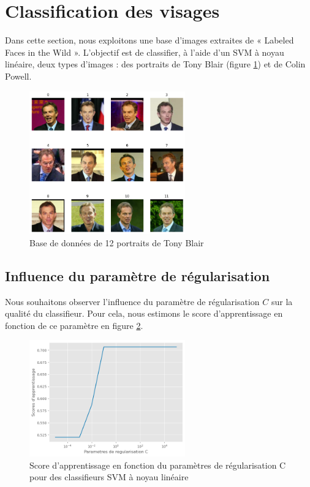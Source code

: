\documentclass[a4paper,12pt]{article}
\begin{document}
\newpage

\section{Classification des visages}

Dans cette section, nous exploitons une base d'images extraites de « Labeled Faces in the Wild ».
L'objectif est de classifier, à l'aide d'un SVM à noyau linéaire, deux types d'images : des portraits de Tony Blair (figure \ref{fig : visages}) et de Colin Powell. 


\begin{figure}[H]
    \centering
    \includegraphics[width=0.6\textwidth]{Images/visages.png}
    \caption{Base de données de 12 portraits de Tony Blair}\label{fig : visages}
\end{figure}

\subsection{Influence du paramètre de régularisation}

Nous souhaitons observer l'influence du paramètre de régularisation $C$ sur la qualité du classifieur. 
Pour cela, nous estimons le score d'apprentissage en fonction de ce paramètre en figure \ref{fig : C}.

\begin{figure}[H]
    \centering
    \includegraphics[width=0.6\textwidth]{Images/erreur_prediction.png}
    \caption{Score d'apprentissage en fonction du paramètres de régularisation C pour des classifieurs SVM à noyau linéaire}\label{fig : C}
\end{figure}
\end{document}
